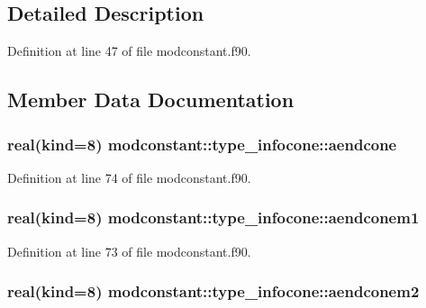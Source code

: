 \subsection{Detailed Description}


Definition at line 47 of file modconstant.\+f90.



\subsection{Member Data Documentation}
\subsubsection[{\texorpdfstring{aendcone}{aendcone}}]{\setlength{\rightskip}{0pt plus 5cm}real(kind=8) modconstant\+::type\+\_\+infocone\+::aendcone}\hypertarget{structmodconstant_1_1type__infocone_a1bab9647b1a025184bc12a622c32ee89}{}\label{structmodconstant_1_1type__infocone_a1bab9647b1a025184bc12a622c32ee89}


Definition at line 74 of file modconstant.\+f90.

\subsubsection[{\texorpdfstring{aendconem1}{aendconem1}}]{\setlength{\rightskip}{0pt plus 5cm}real(kind=8) modconstant\+::type\+\_\+infocone\+::aendconem1}\hypertarget{structmodconstant_1_1type__infocone_ab4b650709fd01e57e6cd61649cd9eae1}{}\label{structmodconstant_1_1type__infocone_ab4b650709fd01e57e6cd61649cd9eae1}


Definition at line 73 of file modconstant.\+f90.

\subsubsection[{\texorpdfstring{aendconem2}{aendconem2}}]{\setlength{\rightskip}{0pt plus 5cm}real(kind=8) modconstant\+::type\+\_\+infocone\+::aendconem2}\hypertarget{structmodconstant_1_1type__infocone_a9355c55f454969fca79d594a315244c1}{}\label{structmodconstant_1_1type__infocone_a9355c55f454969fca79d594a315244c1}


